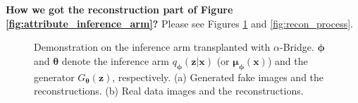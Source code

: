 \documentclass[letterpaper]{article} %
\newcommand{\xv}[0]{\ensuremath{\boldsymbol{x}} }
\newcommand{\zv}[0]{\ensuremath{\boldsymbol{z}} }
\newcommand{\thetav}[0]{\ensuremath{\boldsymbol{\theta}} }
\newcommand{\muv}[0]{\ensuremath{\boldsymbol{\mu}} }
\newcommand{\phiv}[0]{\ensuremath{\boldsymbol{\phi}} }
\begin{document}
\textbf{How we got the reconstruction part of Figure \ref{fig:attribute_inference_arm}?}
Please see Figures \ref{fig:recon_summary} and \ref{fig:recon_process}.




\begin{figure}[H]
	\begin{center}
		\caption{\small Demonstration on the inference arm transplanted with $\alpha$-Bridge. $\phiv$ and $\thetav$ denote the inference arm $q_{\phiv}(\zv|\xv)$ (or $\muv_{\phiv}(\xv)$) and the generator $G_{\thetav}(\zv)$, respectively.  
			(a) Generated fake images and the reconstructions. 
			(b) Real data images and the reconstructions. 
		}
		\label{fig:recon_summary}
	\end{center}
\end{figure}
\end{document}
